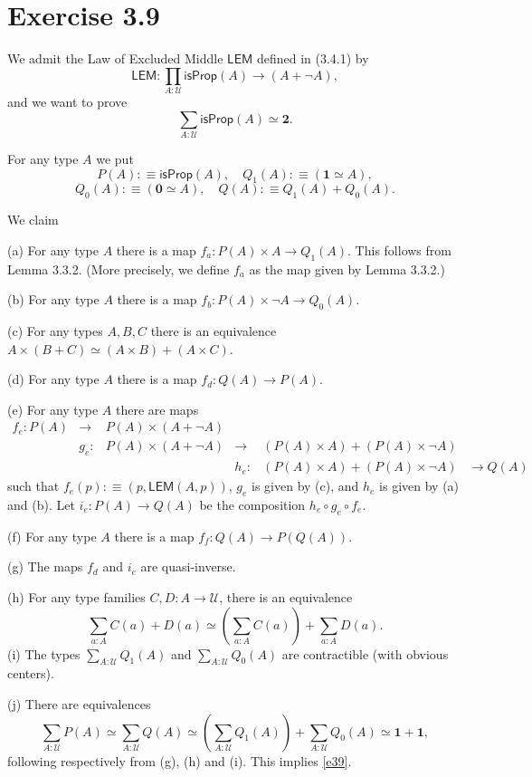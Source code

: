\documentclass[12pt]{article}
\newcommand{\mbf}{\mathbf}
\newcommand{\msf}{\mathsf}
\newcommand{\nn}{\noindent}
\newcommand{\U}{\mathcal U}
\begin{document}
\section{Exercise 3.9}

We admit the Law of Excluded Middle $\msf{LEM}$ defined in (3.4.1) by 
$$
\msf{LEM}:\prod_{A:\U}\msf{isProp}(A)\to(A+\neg A),
$$ 
and we want to prove 
\begin{equation}\label{e39}
\sum_{A:\U}\msf{isProp}(A)\simeq\mbf2.
\end{equation}

For any type $A$ we put 
$$
P(A):\equiv\msf{isProp}(A),\quad Q_1(A):\equiv(\mbf1\simeq A),
$$
$$
Q_0(A):\equiv(\mbf0\simeq A),\quad Q(A):\equiv Q_1(A)+Q_0(A).
$$ 

We claim

\nn(a) For any type $A$ there is a map $f_a:P(A)\times A\to Q_1(A)$. This follows from Lemma 3.3.2. (More precisely, we define $f_a$ as the map given by Lemma 3.3.2.)

\nn(b) For any type $A$ there is a map $f_b:P(A)\times\neg A\to Q_0(A)$.

\nn(c) For any types $A,B,C$ there is an equivalence $A\times(B+C)\simeq(A\times B)+(A\times C)$.

\nn(d) For any type $A$ there is a map $f_d:Q(A)\to P(A)$.

\nn(e) For any type $A$ there are maps 
$$
\begin{matrix}
f_e:P(A)&\to &P(A)\times(A+\neg A)\\ 
        &g_e:&P(A)\times(A+\neg A)&\to &(P(A)\times A)+(P(A)\times\neg A)\\ 
        &    &                    &h_e:&(P(A)\times A)+(P(A)\times\neg A)&\to Q(A)
\end{matrix}
$$ 
such that $f_e(p):\equiv(p,\msf{LEM}(A,p))$, $g_e$ is given by (c), and $h_e$ is given by (a) and (b). Let $i_e:P(A)\to Q(A)$ be the composition $h_e\circ g_e\circ f_e$.

\nn(f) For any type $A$ there is a map $f_f:Q(A)\to P(Q(A))$.

\nn(g) The maps $f_d$ and $i_e$ are quasi-inverse.

\nn(h) For any type families $C,D:A\to\U$, there is an equivalence 
$$
\sum_{a:A}C(a)+D(a)\simeq\left(\sum_{a:A}C(a)\right)+\sum_{a:A}D(a).
$$
\nn(i) The types $\sum_{A:\U}Q_1(A)$ and $\sum_{A:\U}Q_0(A)$ are contractible (with obvious centers).

\nn(j) There are equivalences 
$$
\sum_{A:\U}P(A)\simeq\sum_{A:\U}Q(A)\simeq\left(\sum_{A:\U}Q_1(A)\right)+\sum_{A:\U}Q_0(A)\simeq\mbf1+\mbf1,
$$ 
following respectively from (g), (h) and (i). This implies \eqref{e39}.
\end{document}
